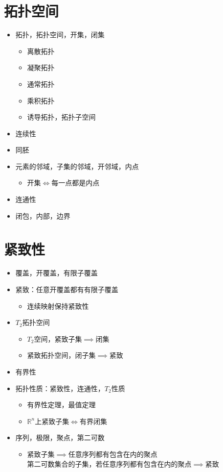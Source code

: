\section{拓扑空间}

\begin{itemize}
    \item 拓扑，拓扑空间，开集，闭集
    \begin{itemize}
        \item 离散拓扑
        \item 凝聚拓扑
        \item 通常拓扑
        \item 乘积拓扑
        \item 诱导拓扑，拓扑子空间
    \end{itemize}
    \item 连续性
    \item 同胚
    \item 元素的邻域，子集的邻域，开邻域，内点
    \begin{itemize}
        \item[\o] 开集$\iff$每一点都是内点
    \end{itemize}
    \item 连通性
    \item 闭包，内部，边界
\end{itemize}

\section{紧致性}

\begin{itemize}
    \item 覆盖，开覆盖，有限子覆盖
    \item 紧致：任意开覆盖都有有限子覆盖
    \begin{itemize}
        \item[\o] 连续映射保持紧致性
    \end{itemize}
    \item $T_2$拓扑空间
    \begin{itemize}
        \item[\o] $T_2$空间，紧致子集$\implies$闭集
        \item[\o] 紧致拓扑空间，闭子集$\implies$紧致
    \end{itemize}
    \item 有界性
    \item 拓扑性质：紧致性，连通性，$T_2$性质
    \begin{itemize}
        \item[\o] 有界性定理，最值定理
        \item $\mathbb{R}^n$上紧致子集$\iff$有界闭集
    \end{itemize}
    \item 序列，极限，聚点，第二可数
    \begin{itemize}
        \item 紧致子集$\implies$任意序列都有包含在内的聚点\\
              第二可数集合的子集，若任意序列都有包含在内的聚点$\implies$紧致
    \end{itemize}
\end{itemize}